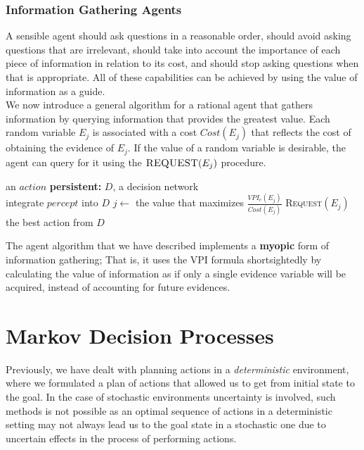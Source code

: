 \documentclass[11pt]{article}
\begin{document}
 \subsubsection{Information Gathering Agents}

A sensible agent should ask questions in a reasonable order, should avoid asking questions that are irrelevant, should take into account the importance of each piece of information in relation to its cost, and should stop asking questions when that is appropriate. All of these capabilities can be achieved by using the value of information as a guide.\\

We now introduce a general algorithm for a rational agent that gathers information by querying information that provides the greatest value. Each random variable $E_j$ is associated with a cost $Cost(E_j)$ that reflects the cost of obtaining the evidence of $E_j$. If the value of a random variable is desirable, the agent can query for it using the $\textsc{REQUEST}(E_j)$ procedure.\\

\begin{algorithmic}
 \Return an $action$
\State \textbf{persistent:} $D$, a decision network\\

\State integrate $percept$ into $D$
\State $j \leftarrow$ the value that maximizes $\frac{VPI_e(E_j)}{Cost(E_j)}$
\State \Return \textsc{Request}$(E_j)$
\Else \Return the best action from $D$
\EndIf

\EndProcedure
\end{algorithmic}

The agent algorithm that we have described implements a \textbf{myopic} form of information gathering; That is, it uses the VPI formula shortsightedly by calculating the value of information as if only a single evidence variable will be acquired, instead of accounting for future evidences.

\pagebreak
\section{Markov Decision Processes}

Previously, we have dealt with planning actions in a \textit{deterministic} environment, where we formulated a plan of actions that allowed us to get from initial state to the goal. In the case of stochastic environments uncertainty is involved, such methods is not possible as an optimal sequence of actions in a deterministic setting may not always lead us to the goal state in a stochastic one due to uncertain effects in the process of performing actions.
\end{document}
